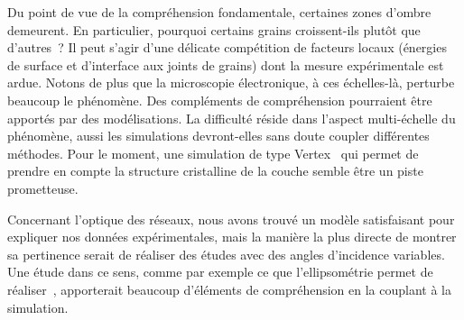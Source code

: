 \vspace{12pt}
Du point de vue de la compréhension fondamentale, certaines zones d'ombre demeurent. En particulier, pourquoi certains grains croissent-ils plutôt que d'autres~? Il peut s'agir d'une délicate compétition de facteurs locaux (énergies de surface et d'interface aux joints de grains) dont la mesure expérimentale est ardue. Notons de plus que la microscopie électronique, à ces échelles-là, perturbe beaucoup le phénomène. Des compléments de compréhension pourraient être apportés par des modélisations. La difficulté réside dans l'aspect multi-échelle du phénomène, aussi les simulations devront-elles sans doute coupler différentes méthodes. Pour le moment, une simulation de type Vertex~\cite{weygand1998vertex} qui permet de prendre en compte la structure cristalline de la couche semble être un piste prometteuse.\par 
Concernant l'optique des réseaux, nous avons trouvé un modèle satisfaisant pour expliquer nos données expérimentales, mais la manière la plus directe de montrer sa pertinence serait de réaliser des études avec des angles d'incidence variables. Une étude dans ce sens, comme par exemple ce que l'ellipsométrie permet de réaliser~\cite{brakstad2015dispersion}, apporterait beaucoup d'éléments de compréhension en la couplant à la simulation.\par  
\newpage


